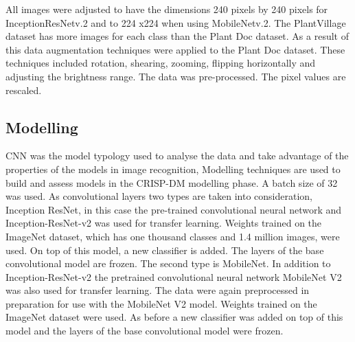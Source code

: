 \documentclass[conference]{IEEEtran}
\begin{document}
All images were adjusted to have the dimensions 240 pixels by 240 pixels for InceptionResNetv.2 and to 224 x224 when using MobileNetv.2. The PlantVillage dataset has more images for each class than the Plant Doc dataset. As a result of this data augmentation techniques were applied to the Plant Doc dataset. These techniques included rotation, shearing, zooming, flipping horizontally and adjusting the brightness range. The data was pre-processed. The pixel values are rescaled. 
\subsection{Modelling}
CNN was the model typology used to analyse the data and take advantage of the properties of the models in image recognition, Modelling techniques are used to build and assess models in the CRISP-DM modelling phase. A batch size of 32 was used. As convolutional layers two types are taken into consideration, Inception ResNet, in this case the pre-trained convolutional neural network and Inception-ResNet-v2 was used for transfer learning. Weights trained on the ImageNet dataset, which has one thousand classes and 1.4 million images, were used. On top of this model, a new classifier is added. The layers of the base convolutional model are frozen. The second type is MobileNet. In addition to Inception-ResNet-v2 the pretrained convolutional neural network MobileNet V2 was also used for transfer learning. The data were again preprocessed in preparation for use with the MobileNet V2 model. Weights trained on the ImageNet dataset were used. As before a new classifier was added on top of this model and the layers of the base convolutional model were frozen. 
\end{document}

